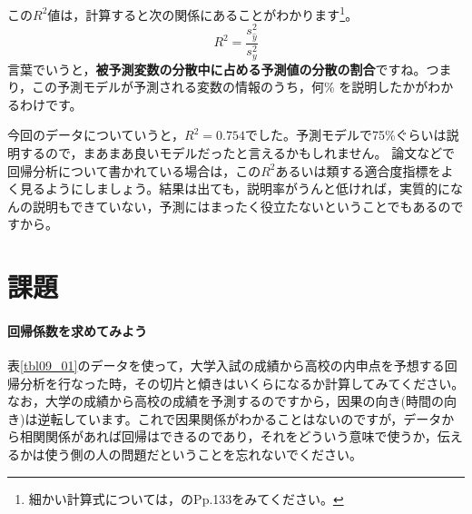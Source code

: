 \documentclass{ltjbook}
\begin{document}
この$R^2$値は，計算すると次の関係にあることがわかります\footnote{細かい計算式については，\textcite{kosugi2018}のPp.133をみてください。}。
\[ R^2 = \frac{s_{\hat{y}}^2}{s_y^2} \]
言葉でいうと，\textbf{被予測変数の分散中に占める予測値の分散の割合}ですね。つまり，この予測モデルが予測される変数の情報のうち，何\% を説明したかがわかるわけです。

今回のデータについていうと，$R^2=0.754$でした。予測モデルで75\%ぐらいは説明するので，まあまあ良いモデルだったと言えるかもしれません。
論文などで回帰分析について書かれている場合は，この$R^2$あるいは類する適合度指標をよく見るようにしましょう。結果は出ても，説明率がうんと低ければ，実質的になんの説明もできていない，予測にはまったく役立たないということでもあるのですから。

\section{課題}
\paragraph{回帰係数を求めてみよう}表\ref{tbl09_01}のデータを使って，大学入試の成績から高校の内申点を予想する回帰分析を行なった時，その切片と傾きはいくらになるか計算してみてください。なお，大学の成績から高校の成績を予測するのですから，因果の向き(時間の向き)は逆転しています。これで因果関係がわかることはないのですが，データから相関関係があれば回帰はできるのであり，それをどういう意味で使うか，伝えるかは使う側の人の問題だということを忘れないでください。
\end{document}
